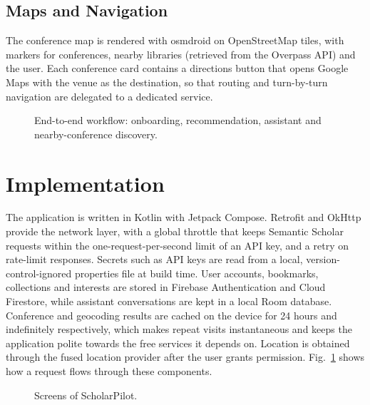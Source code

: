 \documentclass[conference]{IEEEtran}
\begin{document}
\subsection{Maps and Navigation}
The conference map is rendered with osmdroid on OpenStreetMap tiles, with markers for conferences, nearby libraries (retrieved from the Overpass API) and the user. Each conference card contains a directions button that opens Google Maps with the venue as the destination, so that routing and turn-by-turn navigation are delegated to a dedicated service.

\begin{figure}[!t]
    \centering
    \caption{End-to-end workflow: onboarding, recommendation, assistant and nearby-conference discovery.}
    \label{fig:workflow}
\end{figure}

\section{Implementation}
The application is written in Kotlin with Jetpack Compose. Retrofit and OkHttp provide the network layer, with a global throttle that keeps Semantic Scholar requests within the one-request-per-second limit of an API key, and a retry on rate-limit responses. Secrets such as API keys are read from a local, version-control-ignored properties file at build time. User accounts, bookmarks, collections and interests are stored in Firebase Authentication and Cloud Firestore, while assistant conversations are kept in a local Room database. Conference and geocoding results are cached on the device for 24 hours and indefinitely respectively, which makes repeat visits instantaneous and keeps the application polite towards the free services it depends on. Location is obtained through the fused location provider after the user grants permission. Fig.~\ref{fig:workflow} shows how a request flows through these components.

\begin{figure}[!t]
    \centering
    \caption{Screens of ScholarPilot.}
    \label{fig:ui}
\end{figure}
\end{document}
